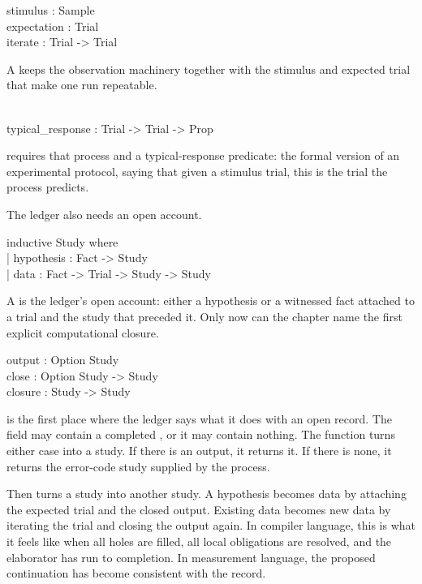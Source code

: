 \begin{leancode}
\quad stimulus : Sample\\
\quad expectation : Trial\\
\quad iterate : Trial -> Trial
\end{leancode}

A  keeps the observation machinery together with the
stimulus and expected trial that make one run repeatable.

\begin{leancode}
\\
typical\_response : Trial -> Trial -> Prop
\end{leancode}

 requires that process and a typical-response predicate: the
formal version of an experimental protocol, saying that given a stimulus trial,
this is the trial the process predicts.

The ledger also needs an open account.

\begin{leancode}
inductive Study where\\
\quad | hypothesis : Fact -> Study\\
\quad | data : Fact -> Trial -> Study -> Study
\end{leancode}

A  is the ledger's open account: either a hypothesis or a
witnessed fact attached to a trial and the study that preceded it. Only now can
the chapter name the first explicit computational closure.

\begin{leancode}
\quad output : Option Study\\
\quad close : Option Study -> Study\\
\quad closure : Study -> Study
\end{leancode}

 is the first place where the ledger says what it
does with an open record. The field  may contain a completed
, or it may contain nothing. The function  turns either
case into a study. If there is an output, it returns it. If there is none, it
returns the error-code study supplied by the process.

Then  turns a study into another study. A hypothesis becomes data
by attaching the expected trial and the closed output. Existing data becomes
new data by iterating the trial and closing the output again. In compiler
language, this is what it feels like when all holes are filled, all local
obligations are resolved, and the elaborator has run to completion. In
measurement language, the proposed continuation has become consistent with the
record.

